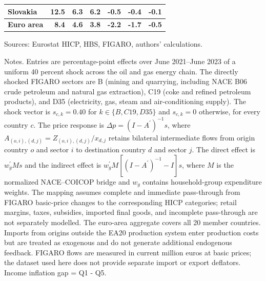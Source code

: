 \documentclass[11pt]{article}
\begin{document}
\begin{table}[H]
\begin{tabular}{lrrrrrr}
 \\
Slovakia & 12.5 & 6.3 & 6.2 & -0.5 & -0.4 & -0.1
 \\
\midrule
\textbf{Euro area} & \textbf{8.4} & \textbf{4.6} & \textbf{3.8} & \textbf{-2.2} & \textbf{-1.7} & \textbf{-0.5}
 \\
\bottomrule
\end{tabular}
\par\vspace{0.35em}\footnotesize\noindent Sources: Eurostat HICP, HBS, FIGARO, authors' calculations.
\par\vspace{0.25em}\footnotesize\noindent Notes. Entries are percentage-point effects over June 2021--June 2023 of a uniform 40 percent shock across the oil and gas energy chain. The directly shocked FIGARO sectors are B (mining and quarrying, including NACE B06 crude petroleum and natural gas extraction), C19 (coke and refined petroleum products), and D35 (electricity, gas, steam and air-conditioning supply). The shock vector is $s_{c,k}=0.40$ for $k\in\{B,C19,D35\}$ and $s_{c,k}=0$ otherwise, for every country $c$. The price response is $\Delta p = (I - A^{\prime})^{-1}s$, where $A_{(o,i),(d,j)}=Z_{(o,i),(d,j)}/x_{d,j}$ retains bilateral intermediate flows from origin country $o$ and sector $i$ to destination country $d$ and sector $j$. The direct effect is $w_g^{\prime}Ms$ and the indirect effect is $w_g^{\prime}M[(I-A^{\prime})^{-1}-I]s$, where $M$ is the normalized NACE--COICOP bridge and $w_g$ contains household-group expenditure weights. The mapping assumes complete and immediate pass-through from FIGARO basic-price changes to the corresponding HICP categories; retail margins, taxes, subsidies, imported final goods, and incomplete pass-through are not separately modelled. The euro-area aggregate covers all 20 member countries. Imports from origins outside the EA20 production system enter production costs but are treated as exogenous and do not generate additional endogenous feedback. FIGARO flows are measured in current million euros at basic prices; the dataset used here does not provide separate import or export deflators. Income inflation gap = Q1 - Q5.
\end{table}
\vspace{0.6em}
\end{document}
